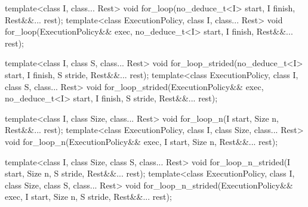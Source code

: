 \begin{itemdecl}
template<class I, class... Rest>
void for_loop(no_deduce_t<I> start, I finish, Rest&&... rest);
template<class ExecutionPolicy,
      class I, class... Rest>
void for_loop(ExecutionPolicy&& exec,
              no_deduce_t<I> start, I finish, Rest&&... rest);

template<class I, class S, class... Rest>
void for_loop_strided(no_deduce_t<I> start, I finish,
                      S stride, Rest&&... rest);
template<class ExecutionPolicy,
      class I, class S, class... Rest>
void for_loop_strided(ExecutionPolicy&& exec,
                      no_deduce_t<I> start, I finish,
                      S stride, Rest&&... rest);

template<class I, class Size, class... Rest>
void for_loop_n(I start, Size n, Rest&&... rest);
template<class ExecutionPolicy,
      class I, class Size, class... Rest>
void for_loop_n(ExecutionPolicy&& exec,
                I start, Size n, Rest&&... rest);
          
template<class I, class Size, class S, class... Rest>
void for_loop_n_strided(I start, Size n, S stride, Rest&&... rest);
template<class ExecutionPolicy, 
      class I, class Size, class S, class... Rest>
void for_loop_n_strided(ExecutionPolicy&& exec,
                        I start, Size n, S stride, Rest&&... rest);
\end{itemdecl}


